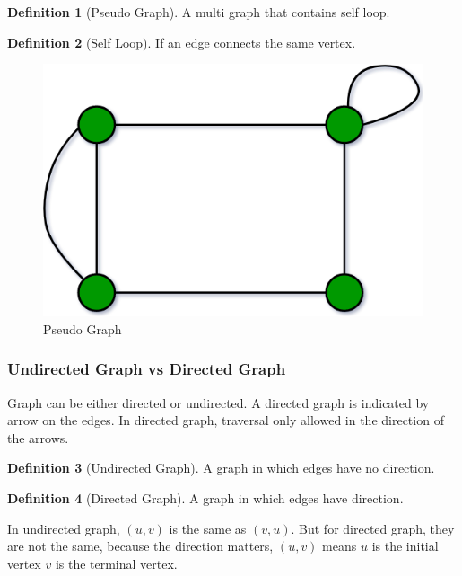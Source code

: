 \documentclass{article}
\theoremstyle{plain}%
\theoremstyle{definition}
\newtheorem{defn}{Definition}[section]
\theoremstyle{remark}
\begin{document}
	\begin{defn}[Pseudo Graph]
		A multi graph that contains self loop.
	\end{defn}

	\begin{defn}[Self Loop]
		If an edge connects the same vertex.
	\end{defn}

	\begin{figure}[htbp]
		\center
		\includegraphics[scale=0.3]{img/pseudo-graph.png}
		\caption{Pseudo Graph}
		\label{fig-pseudo}
	\end{figure}


	\subsubsection{Undirected Graph vs Directed Graph}

	Graph can be either directed or undirected.
	A directed graph is indicated by arrow on the edges.
	In directed graph, traversal only allowed in the direction of the arrows.

	\begin{defn}[Undirected Graph]
		A graph in which edges have no direction.
	\end{defn}

	\begin{defn}[Directed Graph]
		A graph in which edges have direction.
	\end{defn}

	In undirected graph, $(u,v)$ is the same as $(v,u)$. But for directed graph, they are not the same, because the direction matters, $(u,v)$ means $u$ is the initial vertex $v$ is the terminal vertex.
\end{document}
